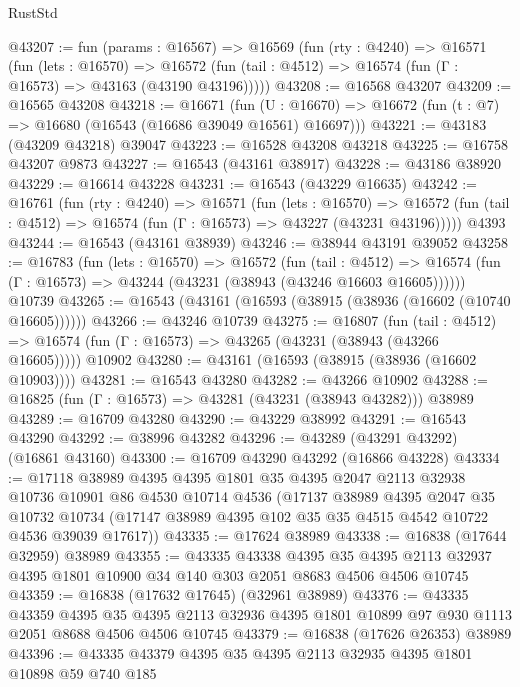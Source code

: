 \begin{lexlean}{RustStd}
\begin{coremodule}
@43207 := fun (params : @16567) =>
  @16569
    (fun (rty : @4240) =>
    @16571
      (fun (lets : @16570) =>
      @16572 (fun (tail : @4512) => @16574 (fun (Γ : @16573) => @43163 (@43190 @43196)))))
@43208 := @16568 @43207
@43209 := @16565 @43208
@43218 := @16671
    (fun (U : @16670) => @16672 (fun (t : @7) => @16680 (@16543 (@16686 @39049 @16561) @16697)))
@43221 := @43183 (@43209 @43218) @39047
@43223 := @16528 @43208 @43218
@43225 := @16758 @43207 @9873
@43227 := @16543 (@43161 @38917)
@43228 := @43186 @38920
@43229 := @16614 @43228
@43231 := @16543 (@43229 @16635)
@43242 := @16761
    (fun (rty : @4240) =>
    @16571
      (fun (lets : @16570) =>
      @16572 (fun (tail : @4512) => @16574 (fun (Γ : @16573) => @43227 (@43231 @43196)))))
    @4393
@43244 := @16543 (@43161 @38939)
@43246 := @38944 @43191 @39052
@43258 := @16783
    (fun (lets : @16570) =>
    @16572
      (fun (tail : @4512) =>
      @16574 (fun (Γ : @16573) => @43244 (@43231 (@38943 (@43246 @16603 @16605))))))
    @10739
@43265 := @16543 (@43161 (@16593 (@38915 (@38936 (@16602 (@10740 @16605))))))
@43266 := @43246 @10739
@43275 := @16807
    (fun (tail : @4512) => @16574 (fun (Γ : @16573) => @43265 (@43231 (@38943 (@43266 @16605)))))
    @10902
@43280 := @43161 (@16593 (@38915 (@38936 (@16602 @10903))))
@43281 := @16543 @43280
@43282 := @43266 @10902
@43288 := @16825 (fun (Γ : @16573) => @43281 (@43231 (@38943 @43282))) @38989
@43289 := @16709 @43280
@43290 := @43229 @38992
@43291 := @16543 @43290
@43292 := @38996 @43282
@43296 := @43289 (@43291 @43292) (@16861 @43160)
@43300 := @16709 @43290 @43292 (@16866 @43228)
@43334 := @17118
    @38989
    @4395
    @4395
    @1801
    @35
    @4395
    @2047
    @2113
    @32938
    @10736
    @10901
    @86
    @4530
    @10714
    @4536
    (@17137
      @38989
      @4395
      @2047
      @35
      @10732
      @10734
      (@17147 @38989 @4395 @102 @35 @35 @4515 @4542 @10722 @4536 @39039 @17617))
@43335 := @17624 @38989
@43338 := @16838 (@17644 @32959) @38989
@43355 := @43335
    @43338
    @4395
    @35
    @4395
    @2113
    @32937
    @4395
    @1801
    @10900
    @34
    @140
    @303
    @2051
    @8683
    @4506
    @4506
    @10745
@43359 := @16838 (@17632 @17645) (@32961 @38989)
@43376 := @43335
    @43359
    @4395
    @35
    @4395
    @2113
    @32936
    @4395
    @1801
    @10899
    @97
    @930
    @1113
    @2051
    @8688
    @4506
    @4506
    @10745
@43379 := @16838 (@17626 @26353) @38989
@43396 := @43335
    @43379
    @4395
    @35
    @4395
    @2113
    @32935
    @4395
    @1801
    @10898
    @59
    @740
    @185

\end{coremodule}
\end{lexlean}
